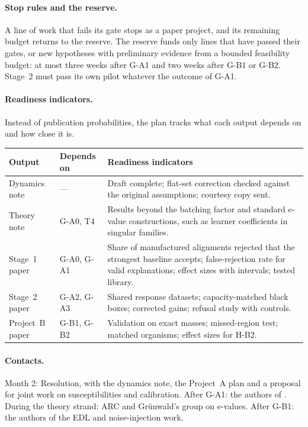 \documentclass[11pt,a4paper]{article}
\begin{document}
\paragraph{Stop rules and the reserve.} A line of work that fails its gate stops as a paper project, and its remaining budget returns to the reserve. The reserve funds only lines that have passed their gates, or new hypotheses with preliminary evidence from a bounded feasibility budget: at most three weeks after G-A1 and two weeks after G-B1 or G-B2. Stage~2 must pass its own pilot whatever the outcome of G-A1.

\paragraph{Readiness indicators.} Instead of publication probabilities,
the plan tracks what each output depends on and how close it is.

\begin{center}
\begin{tabular}{@{}P{2.9cm}P{2.4cm}P{9.6cm}@{}}
\toprule
Output & Depends on & Readiness indicators \\
\midrule
Dynamics note & --- & Draft complete; flat-set correction checked against
the original assumptions; courtesy copy sent. \\ \addlinespace
Theory note & G-A0, T4 & Results beyond the batching factor and standard e-value constructions, such as learner coefficients in singular families. \\ \addlinespace
Stage~1 paper & G-A0, G-A1 & Share of manufactured alignments rejected
that the strongest baseline accepts; false-rejection rate for valid
explanations; effect sizes with intervals; tested library. \\ \addlinespace
Stage~2 paper & G-A2, G-A3 & Shared response datasets; capacity-matched
black boxes; corrected gains; refusal study with controls. \\ \addlinespace
Project~B paper & G-B1, G-B2 & Validation on exact masses; missed-region
test; matched organisms; effect sizes for H-B2. \\
\bottomrule
\end{tabular}
\end{center}

\paragraph{Contacts.} Month 2: Resolution, with the dynamics note, the
Project~A plan and a proposal for joint work on susceptibilities and
calibration. After G-A1: the authors of
\cite{ma2026,sutter2025,meloux2026,gauderis2026}. During the theory strand:
ARC and Gr\"unwald's group on e-values. After G-B1: the authors of the EDL
and noise-injection work.
\end{document}
